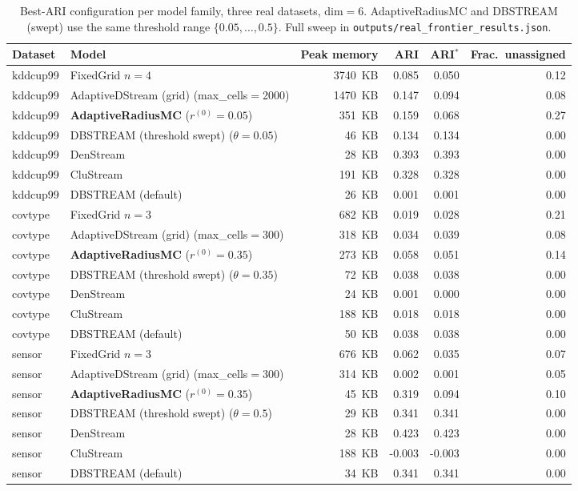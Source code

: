 \documentclass[11pt]{article}
\begin{document}
\begin{table}[h]
\centering
\caption{Best-ARI configuration per model family, three real datasets, dim$=6$. AdaptiveRadiusMC and DBSTREAM (swept) use the same threshold range $\{0.05,\ldots,0.5\}$. Full sweep in \texttt{outputs/real\_frontier\_results.json}.}
\label{tab:real-frontier}
\begin{tabular}{llrrrr}
\toprule
Dataset & Model & Peak memory & ARI & ARI$^*$ & Frac.\ unassigned \\
\midrule
kddcup99 & FixedGrid $n{=}4$ & 3740~KB & 0.085 & 0.050 & 0.12 \\
kddcup99 & AdaptiveDStream (grid) (max\_cells$=$2000) & 1470~KB & 0.147 & 0.094 & 0.08 \\
kddcup99 & \textbf{AdaptiveRadiusMC} ($r^{(0)}{=}0.05$) & 351~KB & 0.159 & 0.068 & 0.27 \\
kddcup99 & DBSTREAM (threshold swept) ($\theta{=}0.05$) & 46~KB & 0.134 & 0.134 & 0.00 \\
kddcup99 & DenStream & 28~KB & 0.393 & 0.393 & 0.00 \\
kddcup99 & CluStream & 191~KB & 0.328 & 0.328 & 0.00 \\
kddcup99 & DBSTREAM (default) & 26~KB & 0.001 & 0.001 & 0.00 \\
\addlinespace
covtype & FixedGrid $n{=}3$ & 682~KB & 0.019 & 0.028 & 0.21 \\
covtype & AdaptiveDStream (grid) (max\_cells$=$300) & 318~KB & 0.034 & 0.039 & 0.08 \\
covtype & \textbf{AdaptiveRadiusMC} ($r^{(0)}{=}0.35$) & 273~KB & 0.058 & 0.051 & 0.14 \\
covtype & DBSTREAM (threshold swept) ($\theta{=}0.35$) & 72~KB & 0.038 & 0.038 & 0.00 \\
covtype & DenStream & 24~KB & 0.001 & 0.000 & 0.00 \\
covtype & CluStream & 188~KB & 0.018 & 0.018 & 0.00 \\
covtype & DBSTREAM (default) & 50~KB & 0.038 & 0.038 & 0.00 \\
\addlinespace
sensor & FixedGrid $n{=}3$ & 676~KB & 0.062 & 0.035 & 0.07 \\
sensor & AdaptiveDStream (grid) (max\_cells$=$300) & 314~KB & 0.002 & 0.001 & 0.05 \\
sensor & \textbf{AdaptiveRadiusMC} ($r^{(0)}{=}0.35$) & 45~KB & 0.319 & 0.094 & 0.10 \\
sensor & DBSTREAM (threshold swept) ($\theta{=}0.5$) & 29~KB & 0.341 & 0.341 & 0.00 \\
sensor & DenStream & 28~KB & 0.423 & 0.423 & 0.00 \\
sensor & CluStream & 188~KB & -0.003 & -0.003 & 0.00 \\
sensor & DBSTREAM (default) & 34~KB & 0.341 & 0.341 & 0.00 \\
\bottomrule
\end{tabular}
\end{table}
\end{document}
